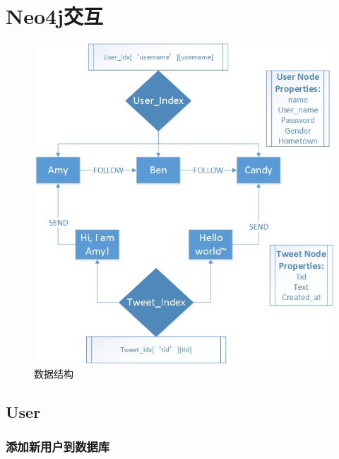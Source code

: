 \documentclass{yaldc}
\begin{document}
\section{Neo4j交互}

\begin{figure}[h!]
    \centering
    \includegraphics[width=.75\textwidth]{ds.jpg}
    \caption{数据结构}
    \label{fig-ds}
\end{figure}

\subsection{User}

\subsubsection{添加新用户到数据库}
\end{document}
